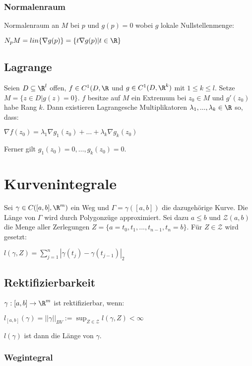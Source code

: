 \subsubsection*{Normalenraum}

Normalenraum an $M$ bei $p$ und $g(p)=0$ wobei $g$ lokale Nullstellenmenge:

$N_p M = lin\{\nabla g(p)\} = \{t\nabla g(p) | t \in \R\}$

\subsection*{Lagrange}

Seien $D \subseteq \R^l$ offen, $f \in C^1(D, \R$ und $g \in C^1(D, \R^k)$ mit $1 \leq k \leq l$. Setze $M=\{z\in D| g(z)=0\}$. $f$ besitze auf $M$ ein Extremum bei $z_0 \in M$ und $g'(z_0)$ habe Rang $k$. Dann existieren Lagrangesche Multiplikatoren $\lambda_1, ..., \lambda_k \in \R$ so, dass:

$\nabla f(z_0) = \lambda_1\nabla g_1(z_0) + \hdots + \lambda_k\nabla g_k(z_0)$

Ferner gilt $g_1(z_0) = 0, \hdots, g_k(z_0)=0$.

\section*{Kurvenintegrale}

Sei $\gamma \in C([a, b], \R^m)$ ein Weg und $\Gamma = \gamma([a, b])$ die dazugehörige Kurve. Die Länge von $\Gamma$ wird durch Polygonzüge approximiert. Sei dazu $a \leq b$ und $\mathcal{Z}(a, b)$ die Menge aller Zerlegungen $Z = \{a = t_0, t_1, ..., t_{n-1}, t_n = b\}$. Für $Z \in \mathcal{Z}$ wird gesetzt:

$l(\gamma, Z) = \sum_{j=1}^n |\gamma(t_j) - \gamma(t_{j-1})|_2$

\subsection*{Rektifizierbarkeit}

$\gamma : [a, b] \rightarrow \R^m$ ist rektifizierbar, wenn:

$l_{[a, b]}(\gamma) = ||\gamma||_{BV} := \sup_{Z\in \mathcal{Z}} l(\gamma, Z) < \infty$

$l(\gamma)$ ist dann die Länge von $\gamma$.

\subsubsection*{Wegintegral}

